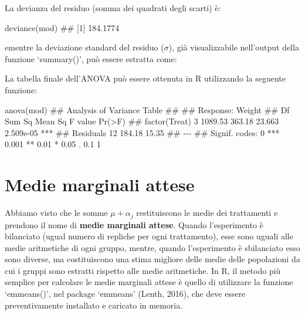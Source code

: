 \documentclass[a4paper,12pt,oneside]{book}
\newenvironment{Shaded}{\begin{snugshade}}{\end{snugshade}}
\newcommand{\SpecialCharTok}[1]{#1}
\newcommand{\DocumentationTok}[1]{#1}
\newcommand{\FunctionTok}[1]{#1}
\newcommand{\NormalTok}[1]{#1}
\begin{document}
La devianza del residuo (somma dei quadrati degli scarti) è:

\begin{Shaded}
\begin{Highlighting}[]
\FunctionTok{deviance}\NormalTok{(mod)}
\DocumentationTok{\#\# [1] 184.1774}
\end{Highlighting}
\end{Shaded}

ementre la deviazione standard del residuo (\(\sigma\)), già visualizzabile nell'output della funzione `summary()', può essere estratta come:

\begin{Shaded}
\end{Shaded}

La tabella finale dell'ANOVA può essere ottenuta in R utilizzando la seguente funzione:

\begin{Shaded}
\begin{Highlighting}[]
\FunctionTok{anova}\NormalTok{(mod)}
\DocumentationTok{\#\# Analysis of Variance Table}
\DocumentationTok{\#\# }
\DocumentationTok{\#\# Response: Weight}
\DocumentationTok{\#\#               Df  Sum Sq Mean Sq F value    Pr(\textgreater{}F)    }
\DocumentationTok{\#\# factor(Treat)  3 1089.53  363.18  23.663 2.509e{-}05 ***}
\DocumentationTok{\#\# Residuals     12  184.18   15.35                      }
\DocumentationTok{\#\# {-}{-}{-}}
\DocumentationTok{\#\# Signif. codes:  0 \textquotesingle{}***\textquotesingle{} 0.001 \textquotesingle{}**\textquotesingle{} 0.01 \textquotesingle{}*\textquotesingle{} 0.05 \textquotesingle{}.\textquotesingle{} 0.1 \textquotesingle{} \textquotesingle{} 1}
\end{Highlighting}
\end{Shaded}

\hypertarget{medie-marginali-attese}{%
\section{Medie marginali attese}\label{medie-marginali-attese}}

Abbiamo visto che le somme \(\mu + \alpha_j\) restituiscono le medie dei trattamenti e prendono il nome di \textbf{medie marginali attese}. Quando l'esperimento è bilanciato (ugual numero di repliche per ogni trattamento), esse sono uguali alle medie aritmetiche di ogni gruppo, mentre, quando l'esperimento è sbilanciato esso sono diverse, ma costituiscono una stima migliore delle medie delle popolazioni da cui i gruppi sono estratti rispetto alle medie aritmetiche. In R, il metodo più semplice per calcolare le medie marginali attese è quello di utilizzare la funzione `emmeans()', nel package `emmeans' (Lenth, 2016), che deve essere preventivamente installato e caricato in memoria.
\end{document}
